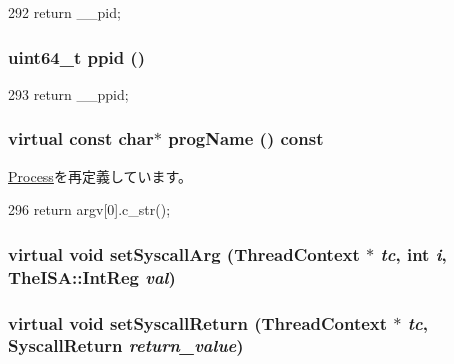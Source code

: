 \begin{DoxyCode}
292 {return __pid;}
\end{DoxyCode}
\hypertarget{classLiveProcess_a4c1e9134209da61d2f8edc374a94f327}{
\subsubsection[{ppid}]{\setlength{\rightskip}{0pt plus 5cm}uint64\_\-t ppid ()}}
\label{classLiveProcess_a4c1e9134209da61d2f8edc374a94f327}



\begin{DoxyCode}
293 {return __ppid;}
\end{DoxyCode}
\hypertarget{classLiveProcess_a580745d5543eb666c37e2a5f37fb32a0}{
\subsubsection[{progName}]{\setlength{\rightskip}{0pt plus 5cm}virtual const char$\ast$ progName () const}}
\label{classLiveProcess_a580745d5543eb666c37e2a5f37fb32a0}


\hyperlink{classProcess_a580745d5543eb666c37e2a5f37fb32a0}{Process}を再定義しています。


\begin{DoxyCode}
296 { return argv[0].c_str(); }
\end{DoxyCode}
\hypertarget{classLiveProcess_a0f596ddb560a15ade4257db3a6c9dd44}{
\subsubsection[{setSyscallArg}]{\setlength{\rightskip}{0pt plus 5cm}virtual void setSyscallArg ({\bf ThreadContext} $\ast$ {\em tc}, \/  int {\em i}, \/  TheISA::IntReg {\em val})}}
\label{classLiveProcess_a0f596ddb560a15ade4257db3a6c9dd44}
\hypertarget{classLiveProcess_a5955e790542b86589b9fd75df24ec2d3}{
\subsubsection[{setSyscallReturn}]{\setlength{\rightskip}{0pt plus 5cm}virtual void setSyscallReturn ({\bf ThreadContext} $\ast$ {\em tc}, \/  {\bf SyscallReturn} {\em return\_\-value})}}
\label{classLiveProcess_a5955e790542b86589b9fd75df24ec2d3}


